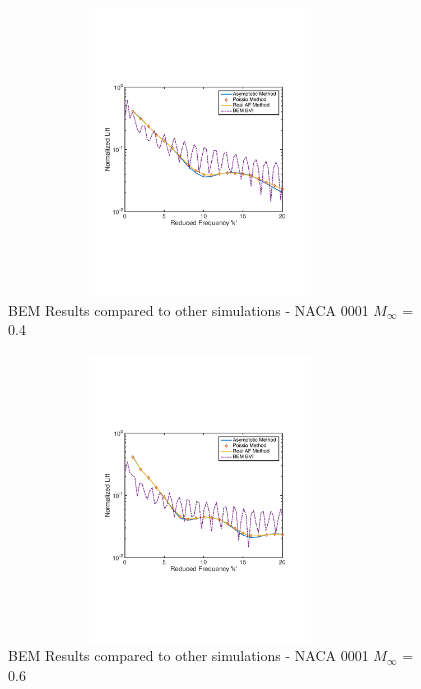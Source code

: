 \documentclass{article}
\begin{document}
\newpage

\begin{figure}[h]
\includegraphics[width = 4in, height = 3in]{NACA0001_m04}
\centering
\caption{BEM Results compared to other simulations - NACA 0001 $M_\infty$ = 0.4}
\end{figure}

\begin{figure}[h]
\includegraphics[width = 4in, height = 3in]{NACA0001_m06}
\centering
\caption{BEM Results compared to other simulations - NACA 0001 $M_\infty$ = 0.6}
\end{figure}
\end{document}
